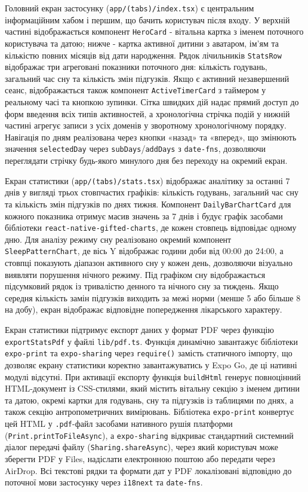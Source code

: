 Головний екран застосунку (\texttt{app/(tabs)/index.tsx}) є центральним інформаційним хабом і першим, що бачить користувач після входу. У верхній частині відображається компонент \texttt{HeroCard} - вітальна картка з іменем поточного користувача та датою; нижче - картка активної дитини з аватаром, ім'ям та кількістю повних місяців від дати народження. Рядок лічильників \texttt{StatsRow} відображає три агреговані показники поточного дня: кількість годувань, загальний час сну та кількість змін підгузків. Якщо є активний незавершений сеанс, відображається також компонент \texttt{ActiveTimerCard} з таймером у реальному часі та кнопкою зупинки. Сітка швидких дій надає прямий доступ до форм введення всіх типів активностей, а хронологічна стрічка подій у нижній частині агрегує записи з усіх доменів у зворотному хронологічному порядку. Навігація по дням реалізована через кнопки «назад» та «вперед», що змінюють значення \texttt{selectedDay} через \texttt{subDays}/\texttt{addDays} з \texttt{date-fns}, дозволяючи переглядати стрічку будь-якого минулого дня без переходу на окремий екран.

Екран статистики (\texttt{app/(tabs)/stats.tsx}) відображає аналітику за останні 7 днів у вигляді трьох стовпчастих графіків: кількість годувань, загальний час сну та кількість змін підгузків по днях тижня. Компонент \texttt{DailyBarChartCard} для кожного показника отримує масив значень за 7 днів і будує графік засобами бібліотеки \texttt{react-native-gifted-charts}, де кожен стовпець відповідає одному дню. Для аналізу режиму сну реалізовано окремий компонент \texttt{SleepPatternChart}, де вісь Y відображає години доби від 00:00 до 24:00, а стовпці показують діапазон активного сну у кожен день, дозволяючи візуально виявляти порушення нічного режиму. Під графіком сну відображається підсумковий рядок із тривалістю денного та нічного сну за тиждень. Якщо середня кількість замін підгузків виходить за межі норми (менше 5 або більше 8 на добу), екран відображає відповідне попередження лікарського характеру.

Екран статистики підтримує експорт даних у формат PDF через функцію \texttt{exportStatsPdf} у файлі \texttt{lib/pdf.ts}. Функція динамічно завантажує бібліотеки \texttt{expo-print} та \texttt{expo-sharing} через \texttt{require()} замість статичного імпорту, що дозволяє екрану статистики коректно завантажуватись у Expo Go, де ці нативні модулі відсутні. При активації експорту функція \texttt{buildHtml} генерує повноцінний HTML-документ із CSS-стилями, який містить вітальну секцію з іменем дитини та датою, окремі картки для годувань, сну та підгузків із таблицями по днях, а також секцію антропометричних вимірювань. Бібліотека \texttt{expo-print} конвертує цей HTML у \texttt{.pdf}-файл засобами нативного рушія платформи (\texttt{Print.printToFileAsync}), а \texttt{expo-sharing} відкриває стандартний системний діалог передачі файлу (\texttt{Sharing.shareAsync}), через який користувач може зберегти PDF у Files, надіслати електронною поштою або передати через AirDrop. Всі текстові рядки та формати дат у PDF локалізовані відповідно до поточної мови застосунку через \texttt{i18next} та \texttt{date-fns}.

